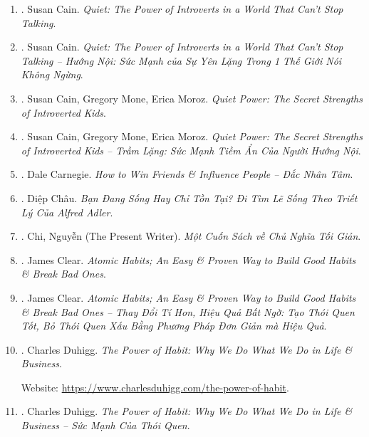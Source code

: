 \documentclass{article}
\begin{document}
\begin{enumerate}
	\item \cite{Cain_quiet}. Susan Cain. {\it Quiet: The Power of Introverts in a World That Can't Stop Talking}.\hfill{\sf[reading]}

	\item \cite{Cain_quiet_VN}. Susan Cain. {\it Quiet: The Power of Introverts in a World That Can't Stop Talking -- Hướng Nội: Sức Mạnh của Sự Yên Lặng Trong 1 Thế Giới Nói Không Ngừng}.\hfill{\sf[done]}

	\item \cite{Cain_Mone_Moroz_quiet_power}. Susan Cain, Gregory Mone, Erica Moroz. {\it Quiet Power: The Secret Strengths of Introverted Kids}.\hfill{\sf[reading]}

	\item \cite{Cain_Mone_Moroz_quiet_power_VN}. Susan Cain, Gregory Mone, Erica Moroz. {\it Quiet Power: The Secret Strengths of Introverted Kids -- Trầm Lặng: Sức Mạnh Tiềm Ẩn Của Người Hướng Nội}.\hfill{\sf[done]}

	\item \cite{Carnegie2021}. Dale Carnegie. {\it How to Win Friends \& Influence People -- Đắc Nhân Tâm}.\hfill{\sf[done]}

	\item \cite{Chau_live_exist}. {\sc Diệp Châu}. {\it Bạn Đang Sống Hay Chỉ Tồn Tại? Đi Tìm Lẽ Sống Theo Triết Lý Của Alfred Adler}.\hfill{\sf[done]}

	\item \cite{Chi_minimalism}. Chi, Nguyễn (The Present Writer). {\it Một Cuốn Sách về Chủ Nghĩa Tối Giản}. \hfill{\sf[done]}

	\item \cite{Clear_habit}. James Clear. {\it Atomic Habits; An Easy \& Proven Way to Build Good Habits \& Break Bad Ones}.\hfill{\sf[reading]}

	\item \cite{Clear_habit_VN}. James Clear. {\it Atomic Habits; An Easy \& Proven Way to Build Good Habits \& Break Bad Ones -- Thay Đổi Tí Hon, Hiệu Quả Bất Ngờ: Tạo Thói Quen Tốt, Bỏ Thói Quen Xấu Bằng Phương Pháp Đơn Giản mà Hiệu Quả}.\hfill{\sf[done]}

	\item \cite{Duhigg_habit}. {\sc Charles Duhigg}. {\it The Power of Habit: Why We Do What We Do in Life \& Business}.

	Website: \url{https://www.charlesduhigg.com/the-power-of-habit}.

	\item \cite{Duhigg_habit_VN}. {\sc Charles Duhigg}. {\it The Power of Habit: Why We Do What We Do in Life \& Business -- Sức Mạnh Của Thói Quen}.\hfill{\sf[done]}


\end{enumerate}
\end{document}
